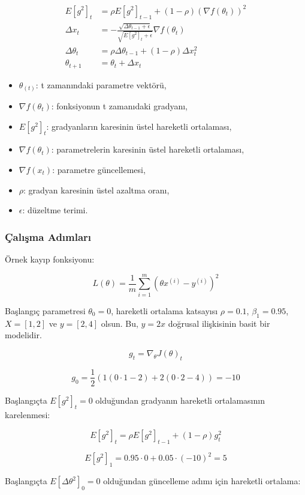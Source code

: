 \begin{align*}
E[g^2]_t & = \rho E[g^2]_{t-1} + (1 - \rho) (\nabla f(\theta_t))^2 \\
\Delta x_t & = - \frac{\sqrt{\Delta \theta_{t-1} + \epsilon}}{\sqrt{E[g^2]_t + \epsilon}} \nabla f(\theta_t) \\
\Delta \theta_t & = \rho \Delta \theta_{t-1} + (1 - \rho) \Delta x_t^2 \\
\theta_{t+1} & = \theta_t + \Delta x_t
\end{align*}

\begin{itemize}
	\item $\theta_(t)$: t zamanındaki parametre vektörü,
	\item $\nabla f(\theta_{t})$: fonksiyonun t zamanıdaki gradyanı,
	\item $E[g^2]_t$: gradyanların karesinin üstel hareketli ortalaması,
	\item $\nabla f(\theta_t)$: parametrelerin karesinin üstel hareketli ortalaması,
	\item $\nabla f(x_t)$: parametre güncellemesi,
	\item $\rho$: gradyan karesinin üstel azaltma oranı,
	\item $\epsilon$: düzeltme terimi.
\end{itemize}

\subsubsection{Çalışma Adımları}

Örnek kayıp fonksiyonu:

\[ L(\theta) = \frac{1}{m} \sum_{i=1}^{m} (\theta x^{(i)} - y^{(i)})^2 \]

Başlangıç parametresi $\theta_0 = 0$, hareketli ortalama katsayısı $\rho = 0.1$, $\beta_1 = 0.95$, $X = [1, 2]$ ve $y = [2, 4]$ olsun. Bu, $y = 2x$ doğrusal ilişkisinin basit bir modelidir.

\[ g_t = \nabla_\theta J(\theta)_t \]

\[ g_0 = \frac{1}{2} (1(0 \cdot 1 - 2) + 2 (0 \cdot 2 - 4)) = -10 \]

Başlangıçta $E[g^2]_t = 0$ olduğundan gradyanın hareketli ortalamasının karelenmesi:

\[ E[g^2]_t = \rho E[g^2]_{t-1} + (1 - \rho) g_{t}^2 \]

\[ E[g^2]_1 = 0.95 \cdot 0 + 0.05 \cdot (-10)^2 = 5 \]

Başlangıçta $E[\Delta \theta^2]_0 = 0$ olduğundan güncelleme adımı için hareketli ortalama:

